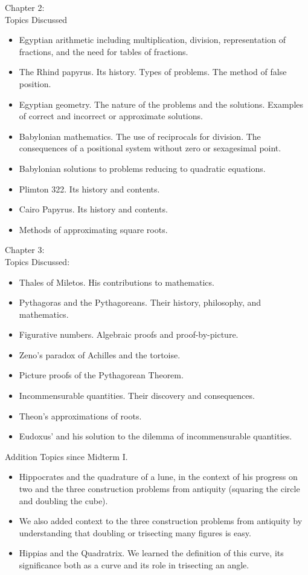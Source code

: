 \documentclass[11pt,fleqn]{article}
\begin{document}
Chapter 2: \\
Topics Discussed 
\begin{itemize}
\item Egyptian arithmetic including multiplication, division, representation of fractions, and the need for tables of fractions. 
\item The Rhind papyrus. Its history. Types of problems. The method of false position. 
\item Egyptian geometry. The nature of the problems and the solutions. Examples of correct and incorrect or approximate solutions.
\item Babylonian mathematics. The use of reciprocals for division. The consequences of a positional system without zero or sexagesimal point.
\item Babylonian solutions to problems reducing to quadratic equations.
\item Plimton 322. Its history and contents. 
\item Cairo Papyrus. Its history and contents. 
\item Methods of approximating square roots.\\
\end{itemize}

Chapter 3:\\
Topics Discussed:
\begin{itemize}
\item Thales of Miletos. His contributions to mathematics.
\item Pythagoras and the Pythagoreans. Their history, philosophy, and mathematics.
\item Figurative numbers. Algebraic proofs and proof-by-picture.
\item Zeno's paradox of Achilles and the tortoise.
\item Picture proofs of the Pythagorean Theorem. 
\item Incommensurable quantities. Their discovery and consequences.
\item Theon's approximations of roots.
\item Eudoxus' and his solution to the dilemma of incommensurable quantities.\\
\end{itemize}

Addition Topics since Midterm I.\\

\begin{itemize}
\item Hippocrates and the quadrature of a lune, in the context of his progress on two and the three construction problems from antiquity (squaring the circle and doubling the cube).
\item We also added context to the three construction problems from antiquity by understanding that doubling or trisecting many figures is easy.
\item Hippias and the Quadratrix. We learned the definition of this curve, its significance both as a curve and its role in trisecting an angle.
\end{itemize}
\end{document}
